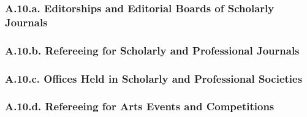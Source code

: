 
\subsubsection*{A.10.a. Editorships and Editorial Boards of Scholarly Journals}


\subsubsection*{A.10.b. Refereeing for Scholarly and Professional Journals}

\subsubsection*{A.10.c. Offices Held in Scholarly and Professional Societies}

\subsubsection*{A.10.d. Refereeing for Arts Events and Competitions}


